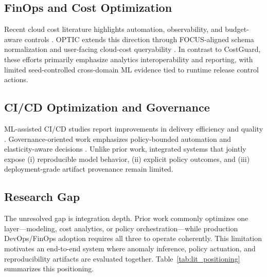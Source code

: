 \documentclass[journal]{IEEEtran}
\begin{document}
\subsection{FinOps and Cost Optimization}
Recent cloud cost literature highlights automation, observability, and budget-aware controls \cite{ref_deochake_review,ref_abacus}. OPTIC extends this direction through FOCUS-aligned schema normalization and user-facing cloud-cost queryability \cite{ref_optic}. In contrast to CostGuard, these efforts primarily emphasize analytics interoperability and reporting, with limited seed-controlled cross-domain ML evidence tied to runtime release control actions.

\subsection{CI/CD Optimization and Governance}
ML-assisted CI/CD studies report improvements in delivery efficiency and quality \cite{ref_sridivya,ref_lokiny,ref_koneru,ref_thason,ref_pereira}. Governance-oriented work emphasizes policy-bounded automation and elasticity-aware decisions \cite{ref_kirubakaran,ref_slingshot}. Unlike prior work, integrated systems that jointly expose (i) reproducible model behavior, (ii) explicit policy outcomes, and (iii) deployment-grade artifact provenance remain limited.

\subsection{Research Gap}
The unresolved gap is integration depth. Prior work commonly optimizes one layer---modeling, cost analytics, or policy orchestration---while production DevOps/FinOps adoption requires all three to operate coherently. This limitation motivates an end-to-end system where anomaly inference, policy actuation, and reproducibility artifacts are evaluated together. Table~\ref{tab:lit_positioning} summarizes this positioning.
\end{document}
